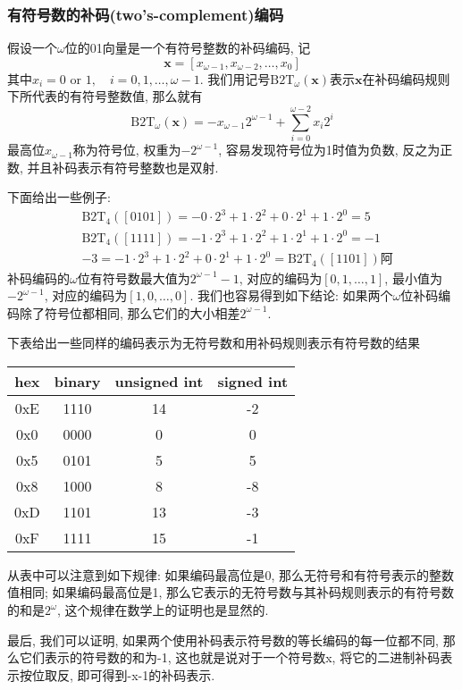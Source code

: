 \documentclass[utf8]{ctexart} %
\begin{document}
\subsubsection{有符号数的补码(two's-complement)编码}
假设一个$\omega$位的01向量是一个有符号整数的补码编码, 记$$\boldsymbol{x}=[x_{\omega-1},x_{\omega-2},\dots,x_0]$$
其中$x_i=0\text{ or }1,\quad i=0,1,\dots,\omega-1$. 我们用记号$\mathrm{B2T}_{\omega}(\boldsymbol{x})$表示$\boldsymbol{x}$在补码编码规则下所代表的有符号整数值, 那么就有
$$\mathrm{B2T}_{\omega}(\boldsymbol{x})=-x_{\omega-1}2^{\omega-1}+\sum_{i=0}^{\omega-2}x_i2^i$$
最高位$x_{\omega-1}$称为符号位, 权重为$-2^{\omega-1}$, 容易发现符号位为1时值为负数, 反之为正数,  并且补码表示有符号整数也是双射.\par 
下面给出一些例子:
$$\begin{aligned}
&\mathrm{B2T}_{4}([0101])=-0\cdot2^3+1\cdot2^2+0\cdot2^1+1\cdot2^0 = 5\\
&\mathrm{B2T}_{4}([1111])=-1\cdot2^3+1\cdot2^2+1\cdot2^1+1\cdot2^0 = -1\\
&-3=-1\cdot2^3+1\cdot2^2+0\cdot2^1+1\cdot2^0 =\mathrm{B2T}_{4}([1101])阿
\end{aligned}$$
补码编码的$\omega$位有符号数最大值为$2^{\omega-1}-1$, 对应的编码为$[0,1,\dots,1]$, 最小值为$-2^{\omega-1}$, 对应的编码为$[1,0,\dots,0]$. 我们也容易得到如下结论: 如果两个$\omega$位补码编码除了符号位都相同, 那么它们的大小相差$2^{\omega-1}$.\par 
下表给出一些同样的编码表示为无符号数和用补码规则表示有符号数的结果
\begin{table}[H]
	\begin{center}	
		\begin{tabular}{c|c|c|c}
			\textbf{hex} & \textbf{binary} & \textbf{unsigned int} &
			\textbf{signed int}\\
			\hline
			0xE & 1110 & 14 & -2\\
			\hline
			0x0 & 0000 & 0 & 0\\
			\hline
			0x5 & 0101 & 5 & 5\\
			\hline
			0x8 & 1000 & 8 & -8\\
			\hline
			0xD & 1101 & 13 & -3\\
			\hline
			0xF & 1111 & 15 & -1\\
			\hline
		\end{tabular}
	\end{center}
\end{table}
从表中可以注意到如下规律: 如果编码最高位是0, 那么无符号和有符号表示的整数值相同; 如果编码最高位是1, 那么它表示的无符号数与其补码规则表示的有符号数的和是$2^{\omega}$, 这个规律在数学上的证明也是显然的.\par 
最后, 我们可以证明, 如果两个使用补码表示符号数的等长编码的每一位都不同, 那么它们表示的符号数的和为-1, 这也就是说对于一个符号数x, 将它的二进制补码表示按位取反, 即可得到-x-1的补码表示. 
\end{document}
